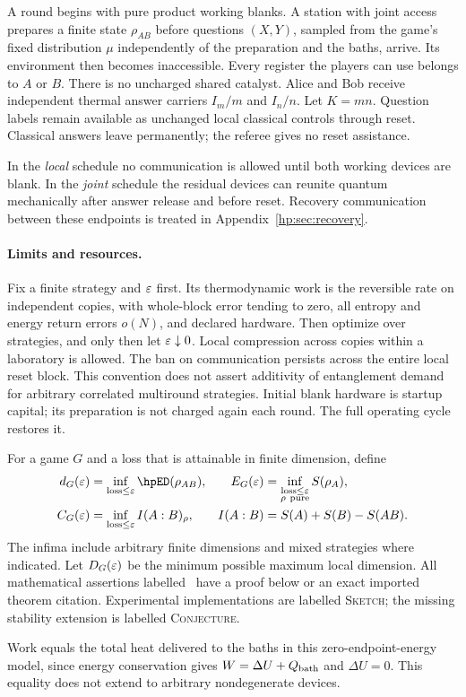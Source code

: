 A round begins with pure product working blanks. A station with joint access prepares a finite state $\rho_{AB}$ before questions $(X,Y)$, sampled from the game's fixed distribution $\mu$ independently of the preparation and the baths, arrive. Its environment then becomes inaccessible. Every register the players can use belongs to $A$ or $B$. There is no uncharged shared catalyst. Alice and Bob receive independent thermal answer carriers $I_m/m$ and $I_n/n$. Let $K=mn$. Question labels remain available as unchanged local classical controls through reset. Classical answers leave permanently; the referee gives no reset assistance.

In the \emph{local} schedule no communication is allowed until both working devices are blank. In the \emph{joint} schedule the residual devices can reunite quantum mechanically after answer release and before reset. Recovery communication between these endpoints is treated in Appendix~\ref{hp:sec:recovery}.

\paragraph{Limits and resources.}
Fix a finite strategy and $\varepsilon$ first. Its thermodynamic work is the reversible rate on independent copies, with whole-block error tending to zero, all entropy and energy return errors $o(N)$, and declared hardware. Then optimize over strategies, and only then let $\varepsilon\downarrow0$. Local compression across copies within a laboratory is allowed. The ban on communication persists across the entire local reset block. This convention does not assert additivity of entanglement demand for arbitrary correlated multiround strategies. Initial blank hardware is startup capital; its preparation is not charged again each round. The full operating cycle restores it.

For a game $G$ and a loss that is attainable in finite dimension, define
\begin{align}
 d_G(\eps)&=\inf_{\mathrm{loss}\le\eps}\hpED(\rho_{AB}),&
 E_G(\eps)&=\inf_{\substack{\mathrm{loss}\le\eps\\\rho\ \mathrm{pure}}}S(\rho_A),\label{hp:eq:demands}\\
 C_G(\eps)&=\inf_{\mathrm{loss}\le\eps}I(A:B)_\rho,&
 I(A:B)&=S(A)+S(B)-S(AB).
\end{align}
The infima include arbitrary finite dimensions and mixed strategies where indicated. Let $D_G(\varepsilon)$ be the minimum possible maximum local dimension. All mathematical assertions labelled \hpproved\ have a proof below or an exact imported theorem citation. Experimental implementations are labelled \textsc{Sketch}; the missing stability extension is labelled \textsc{Conjecture}.

Work equals the total heat delivered to the baths in this zero-endpoint-energy model, since energy conservation gives $W=\Delta U+Q_{\rm bath}$ and $\Delta U=0$. This equality does not extend to arbitrary nondegenerate devices.

